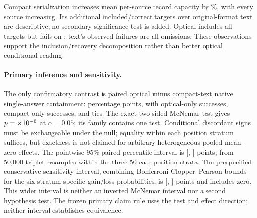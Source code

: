 Compact serialization increases mean per-source record capacity by \%, with every source increasing. Its additional  included/correct targets over original-format text are descriptive; no secondary significance test is added. Optical includes all  targets but fails on ; text's observed failures are all omissions. These observations support the inclusion/recovery decomposition rather than better optical conditional reading.

\paragraph{Primary inference and sensitivity.}
The only confirmatory contrast is paired optical minus compact-text native single-answer containment:  percentage points, with  optical-only successes,  compact-only successes, and  ties. The exact two-sided McNemar test gives $p=\nval{compact.p}\times10^{-6}$ at $\alpha=0.05$; its family contains one test. Conditional discordant signs must be exchangeable under the null; equality within each position stratum suffices, but exactness is not claimed for arbitrary heterogeneous pooled mean-zero effects. The pointwise 95\% paired percentile interval is [, ] points, from 50,000 triplet resamples within the three 50-case position strata. The prespecified conservative sensitivity interval, combining Bonferroni Clopper--Pearson bounds for the six stratum-specific gain/loss probabilities, is [, ] points and includes zero. This wider interval is neither an inverted McNemar interval nor a second hypothesis test. The frozen primary claim rule uses the test and effect direction; neither interval establishes equivalence.

\begin{table}[ht]\centering\small
\caption{Compact-storage native input accounting. All values are processor-native counts; source-native tokens average  (range --). Text has zero vision tokens, so its nonvision count equals total. Source counts are diagnostics, not an additive part of the already templated total. Unused reserve is retained.}
\label{tab:compact_inputs}
\end{table}

